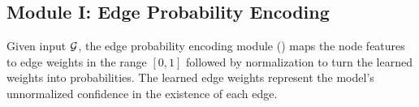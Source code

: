 \subsection{Module I: Edge Probability Encoding}
Given input ${\mathcal{G}}$, the edge probability encoding module (\edgemlp) maps the node features to edge weights in the range $[0,1]$ followed by normalization to turn the learned weights into probabilities. The learned edge weights represent the model's unnormalized confidence in the existence of each edge. 
% 
% 
